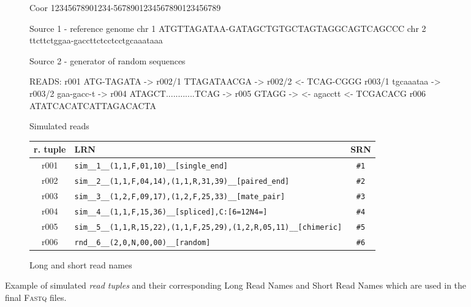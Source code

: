 \documentclass[10pt,a4paper]{article}
\begin{document}
\begin{figure}[!tpb]
\centering

\begin{subfigure}{1.0\linewidth}
\centering
\begin{verbbox}[\ ]
Coor        12345678901234-5678901234567890123456789
                                                    
Source 1 - reference genome                        
chr 1       ATGTTAGATAA-GATAGCTGTGCTAGTAGGCAGTCAGCCC
chr 2       ttcttctggaa-gaccttctcctcctgcaaataaa     
                                                    
Source 2 - generator of random sequences                  
                                                    
READS:                                              
r001        ATG-TAGATA ->                           
r002/1         TTAGATAACGA ->                       
r002/2                                  <- TCAG-CGGG
r003/1                               tgcaaataa ->
r003/2              gaa-gacc-t ->                    
r004                       ATAGCT............TCAG ->
r005                                 GTAGG ->
             <- agacctt                           
                        <- TCGACACG   
r006       ATATCACATCATTAGACACTA
\end{verbbox}
\fbox{
\theverbbox
}

\caption{Simulated reads}
\end{subfigure}


\begin{subfigure}{1.0\linewidth}
\centering
\begin{tabular}{c|p{12.0cm}|c}
 \textbf{r. tuple} & \textbf{LRN} & \textbf{SRN} \\\hline
 r001
 	& \texttt{sim\_\_1\_\_(1,1,F,01,10)\_\_[single\_end]}
 	& \texttt{\#1}
 \\\hline
 r002
 	& \texttt{sim\_\_2\_\_(1,1,F,04,14),(1,1,R,31,39)\_\_[paired\_end]}
 	& \texttt{\#2}
 \\\hline
 r003
 	& \texttt{sim\_\_3\_\_(1,2,F,09,17),(1,2,F,25,33)\_\_[mate\_pair]}
 	& \texttt{\#3}
 \\\hline
 r004
 	& \texttt{sim\_\_4\_\_(1,1,F,15,36)\_\_[spliced],{}C:[6=12N4=]}
   	& \texttt{\#4}
 \\\hline
 r005
 	& \texttt{sim\_\_5\_\_(1,1,R,15,22),(1,1,F,25,29),(1,2,R,05,11)\_\_[chimeric]}
 	& \texttt{\#5}
 \\\hline
 r006
 	& \texttt{rnd\_\_6\_\_(2,0,N,00,00)\_\_[random]}
 	& \texttt{\#6}\\
\end{tabular}
\caption{Long and short read names}
\end{subfigure}
\caption{Example of simulated {\em read tuples} and their corresponding
Long Read Names and Short Read Names which are used
in the final \textsc{Fastq} files.
}
\end{figure}
\end{document}
